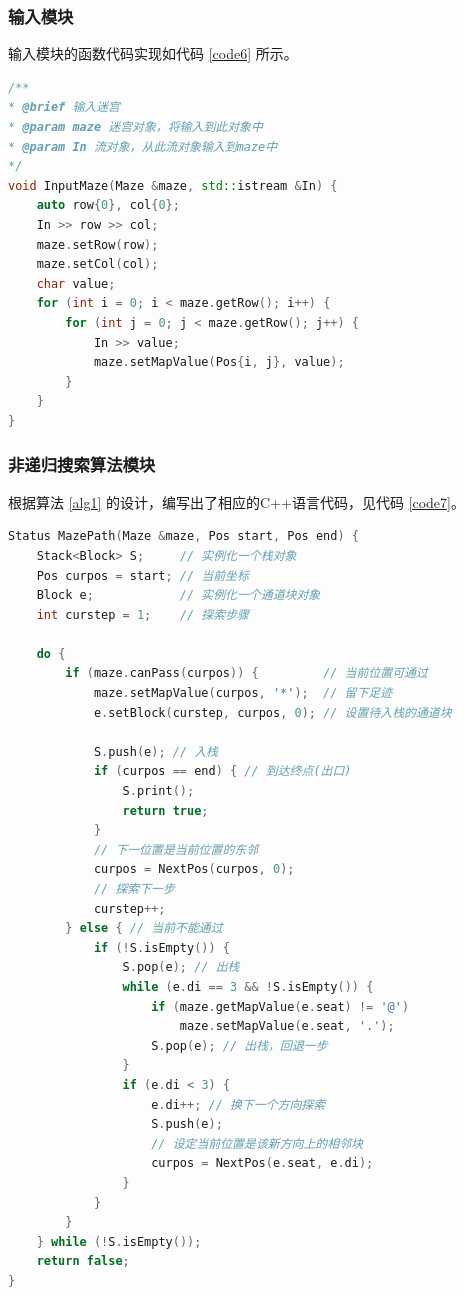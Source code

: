 \documentclass{ctexart}
\begin{document}
    \subsubsection{输入模块}
    输入模块的函数代码实现如代码 \ref{code6} 所示。
\begin{lstlisting}[language=C++,caption=输入模块,label=code6]
/**
* @brief 输入迷宫
* @param maze 迷宫对象，将输入到此对象中
* @param In 流对象，从此流对象输入到maze中
*/
void InputMaze(Maze &maze, std::istream &In) {
    auto row{0}, col{0};
    In >> row >> col;
    maze.setRow(row);
    maze.setCol(col);
    char value;
    for (int i = 0; i < maze.getRow(); i++) {
        for (int j = 0; j < maze.getRow(); j++) {
            In >> value;
            maze.setMapValue(Pos{i, j}, value);
        }
    }
}
\end{lstlisting}


    \subsubsection{非递归搜索算法模块}
    根据算法 \ref{alg1} 的设计，编写出了相应的C++语言代码，见代码 \ref{code7}。
\begin{lstlisting}[language=C++,caption=非递归搜索算法模块代码,label=code7]
Status MazePath(Maze &maze, Pos start, Pos end) {
    Stack<Block> S;     // 实例化一个栈对象
    Pos curpos = start; // 当前坐标
    Block e;            // 实例化一个通道块对象
    int curstep = 1;    // 探索步骤

    do {
        if (maze.canPass(curpos)) {         // 当前位置可通过
            maze.setMapValue(curpos, '*');  // 留下足迹
            e.setBlock(curstep, curpos, 0); // 设置待入栈的通道块

            S.push(e); // 入栈
            if (curpos == end) { // 到达终点(出口)
                S.print();
                return true;
            }
            // 下一位置是当前位置的东邻
            curpos = NextPos(curpos, 0);
            // 探索下一步
            curstep++;
        } else { // 当前不能通过
            if (!S.isEmpty()) {
                S.pop(e); // 出栈
                while (e.di == 3 && !S.isEmpty()) {
                    if (maze.getMapValue(e.seat) != '@')
                        maze.setMapValue(e.seat, '.');
                    S.pop(e); // 出栈，回退一步
                }
                if (e.di < 3) {
                    e.di++; // 换下一个方向探索
                    S.push(e);
                    // 设定当前位置是该新方向上的相邻块
                    curpos = NextPos(e.seat, e.di);
                }
            }
        }
    } while (!S.isEmpty());
    return false;
}
\end{lstlisting}
\end{document}
